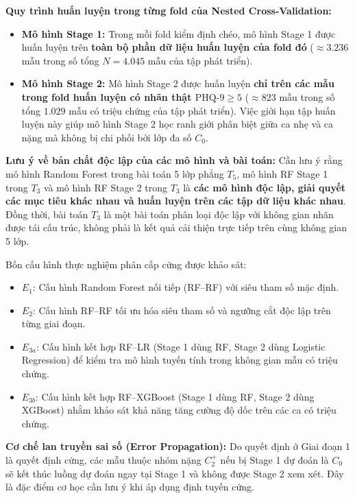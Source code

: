 \textbf{Quy trình huấn luyện trong từng fold của Nested Cross-Validation:}
\begin{itemize}
    \item \textbf{Mô hình Stage 1:} Trong mỗi fold kiểm định chéo, mô hình Stage 1 được huấn luyện trên \textbf{toàn bộ phần dữ liệu huấn luyện của fold đó} ($\approx 3.236$ mẫu trong số tổng $N = 4.045$ mẫu của tập phát triển).
    \item \textbf{Mô hình Stage 2:} Mô hình Stage 2 được huấn luyện \textbf{chỉ trên các mẫu trong fold huấn luyện có nhãn thật $\text{PHQ-9} \ge 5$} ($\approx 823$ mẫu trong số tổng $1.029$ mẫu có triệu chứng của tập phát triển). Việc giới hạn tập huấn luyện này giúp mô hình Stage 2 học ranh giới phân biệt giữa ca nhẹ và ca nặng mà không bị chi phối bởi lớp đa số $C_0$.
\end{itemize}

\noindent\textbf{Lưu ý về bản chất độc lập của các mô hình và bài toán:} Cần lưu ý rằng mô hình Random Forest trong bài toán 5 lớp phẳng $T_5$, mô hình RF Stage 1 trong $T_3$ và mô hình RF Stage 2 trong $T_3$ là \textbf{các mô hình độc lập, giải quyết các mục tiêu khác nhau và huấn luyện trên các tập dữ liệu khác nhau}. Đồng thời, bài toán $T_3$ là một bài toán phân loại độc lập với không gian nhãn được tái cấu trúc, không phải là kết quả cải thiện trực tiếp trên cùng không gian 5 lớp.

Bốn cấu hình thực nghiệm phân cấp cứng được khảo sát:
\begin{itemize}
    \item $E_1$: Cấu hình Random Forest nối tiếp (RF--RF) với siêu tham số mặc định.
    \item $E_2$: Cấu hình RF--RF tối ưu hóa siêu tham số và ngưỡng cắt độc lập trên từng giai đoạn.
    \item $E_{3a}$: Cấu hình kết hợp RF--LR (Stage 1 dùng RF, Stage 2 dùng Logistic Regression) để kiểm tra mô hình tuyến tính trong không gian mẫu có triệu chứng.
    \item $E_{3b}$: Cấu hình kết hợp RF--XGBoost (Stage 1 dùng RF, Stage 2 dùng XGBoost) nhằm khảo sát khả năng tăng cường độ dốc trên các ca có triệu chứng.
\end{itemize}

\textbf{Cơ chế lan truyền sai số (Error Propagation):} Do quyết định ở Giai đoạn 1 là quyết định cứng, các mẫu thuộc nhóm nặng $C_2^+$ nếu bị Stage 1 dự đoán là $C_0$ sẽ kết thúc luồng dự đoán ngay tại Stage 1 và không được Stage 2 xem xét. Đây là đặc điểm cơ học cần lưu ý khi áp dụng định tuyến cứng.

